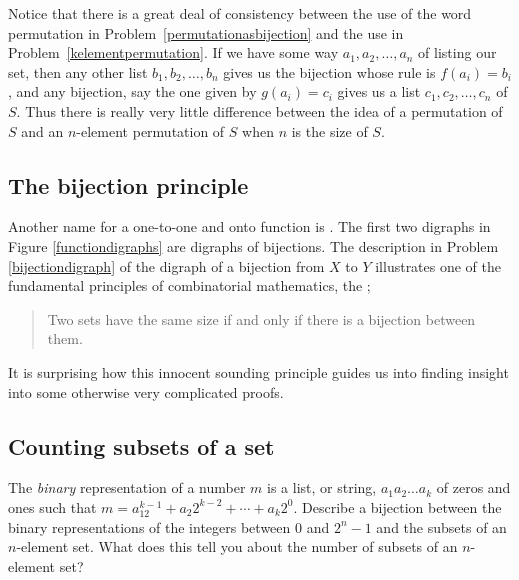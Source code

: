 Notice that there is a great deal of consistency between the use of
the word permutation in Problem~\ref{permutationasbijection} and the
use in Problem~\ref{kelementpermutation}.  If we have
some way $a_1,a_2,\ldots,a_n$ of listing our set, then any other list
$b_1,b_2,\ldots,b_n$ gives us the bijection whose rule is
$f(a_i) =b_i$, and any bijection, say the one given by $g(a_i)=c_i$
gives us a list $c_1,c_2,\ldots,c_n$ of $S$.  Thus there is really
very little difference between the idea of a permutation of $S$ and an
$n$-element permutation of $S$ when $n$ is the size of $S$.


\subsection{The bijection principle} Another name for a one-to-one
and onto function is .  The first two digraphs in Figure \ref{functiondigraphs} are
digraphs of bijections.  The description in Problem
\ref{bijectiondigraph} of the digraph of a bijection  from
$X$ to
$Y$ illustrates one of the fundamental principles of combinatorial
mathematics, the
;
\begin{quote}  Two sets have the same size if and only if
there is a bijection between them.
\end{quote} It is surprising how this innocent sounding
principle guides us into finding insight into some otherwise
very complicated proofs.

\subsection{Counting subsets of a set}
\bp 
\item The {\em binary} representation of a number $m$ is a list, or string,
$a_1a_2\ldots a_k$ of zeros and ones such that $m=a_12^{k-1} + a_2 2^{k-2}
+\cdots+ a_k 2^0.$  Describe a bijection between the binary representations of
the integers between 0 and $2^n-1$ and the subsets of an $n$-element set. 
What does this tell you about the number of subsets of an $n$-element
set?\label{SubsetsBinaryRepresentation}
\ep

